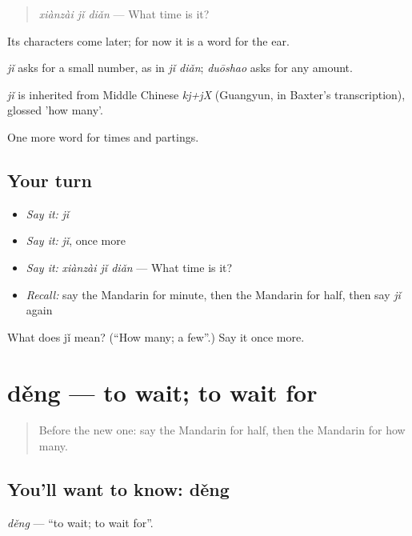 \begin{quote}
\emph{xiànzài jǐ diǎn} — What time is it?
\end{quote}

Its characters come later; for now it is a word for the ear.

\emph{jǐ} asks for a small number, as in \emph{jǐ diǎn}; \emph{duōshao} asks for any amount.

\begin{cousinweb}
\emph{jǐ} is inherited from Middle Chinese \emph{kj+jX} (Guangyun, in Baxter's transcription), glossed 'how many'.
\end{cousinweb}

\begin{grammarlens}[title={What you've built}]
One more word for times and partings.
\end{grammarlens}

\subsection*{Your turn}
\begin{itemize}
\raggedright
  \item \emph{Say it:} \emph{jǐ}
  \item \emph{Say it:} \emph{jǐ}, once more
  \item \emph{Say it:} \emph{xiànzài jǐ diǎn} — What time is it?
  \item \emph{Recall:} say the Mandarin for minute, then the Mandarin for half, then say \emph{jǐ} again
\end{itemize}

\begin{tcolorbox}[breakable,colback=teal!4,colframe=teal!35!black,title={Before you move on}]
What does jǐ mean? (\textquotedblleft{}How many; a few\textquotedblright{}.) Say it once more.
\end{tcolorbox}
\section[děng]{děng — to wait; to wait for}

\label{lesson:ZH-C48-deng}



\begin{quote}
Before the new one: say the Mandarin for half, then the Mandarin for how many.
\end{quote}

\subsection*{You'll want to know: děng}
\emph{děng} — \textquotedblleft{}to wait; to wait for\textquotedblright{}.

